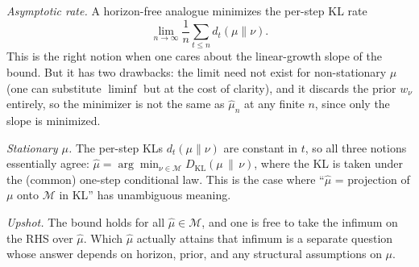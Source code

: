 \documentclass[fontsize=11pt, parskip=half]{scrartcl}
\newcommand{\Mc}{\mathcal{M}}
\begin{document}
\textit{Asymptotic rate.} A horizon-free analogue minimizes the per-step KL
rate $$\lim_{n \to \infty} \frac{1}{n} \sum_{t \leq n} d_t(\mu \parallel \nu).$$ This is the right notion when one cares about the linear-growth slope of the bound. But it has two drawbacks: the limit need not exist for non-stationary $\mu$ (one can substitute $\liminf$ but at the cost of clarity), and it discards the prior $w_\nu$ entirely, so the minimizer is not the same as $\hat\mu_n$ at any finite $n$, since only the slope is minimized.

\textit{Stationary $\mu$.} The per-step KLs $d_t(\mu \parallel \nu)$ are constant in $t$, so all three notions essentially agree: $\hat\mu = \arg\min_{\nu \in \Mc} D_{\text{KL}}(\mu \,\|\, \nu)$, where the KL is taken under the (common) one-step conditional law. This is the case where ``$\hat\mu$ = projection of $\mu$ onto $\Mc$ in KL'' has unambiguous meaning.

\textit{Upshot.} The bound holds for all $\hat\mu \in \Mc$, and one is free
to take the infimum on the RHS over $\hat\mu$. Which $\hat\mu$ actually
attains that infimum is a separate question whose answer depends on horizon,
prior, and any structural assumptions on $\mu$.



\end{document}
